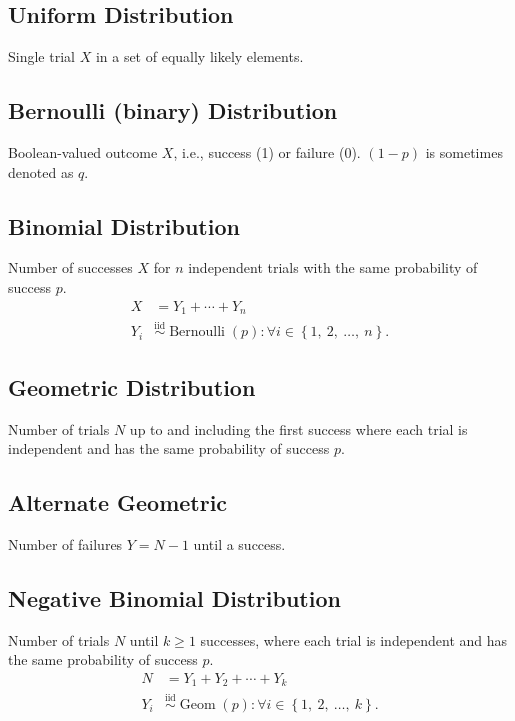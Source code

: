 \documentclass{article}
\begin{document}
\begin{minipage}{62.39259259mm}
    \subsection{Uniform Distribution}
    Single trial \(X\) in a set of equally likely elements.
    \subsection{Bernoulli (binary) Distribution}
    Boolean-valued outcome \(X\), i.e., success (1) or failure (0).
    \(\left( 1 - p \right)\) is sometimes denoted as \(q\).
    \subsection{Binomial Distribution}
    Number of successes \(X\) for \(n\) independent trials with the same probability of success \(p\).
    \begin{align*}
        X   & = Y_1 + \cdots + Y_n                                                                                                           \\
        Y_i & \overset{\mathrm{iid}}{\sim} \operatorname{Bernoulli}{\left( p \right)} : \forall i \in \left\{ 1,\: 2,\: \dots,\: n \right\}.
    \end{align*}
    \subsection{Geometric Distribution}
    Number of trials \(N\) up to and including the first success where each trial is independent and has the same probability of success \(p\).
    \subsection{Alternate Geometric}
    Number of failures \(Y = N - 1\) until a success.
    \subsection{Negative Binomial Distribution}
    Number of trials \(N\) until \(k \geq 1\) successes, where each trial is independent and has the same probability of success \(p\).
    \begin{align*}
        N   & = Y_1 + Y_2 + \cdots + Y_k                                                                                                \\
        Y_i & \overset{\mathrm{iid}}{\sim} \operatorname{Geom}{\left( p \right)} : \forall i \in \left\{ 1,\: 2,\: \dots,\: k \right\}.
    \end{align*}

\end{minipage}
\end{document}
